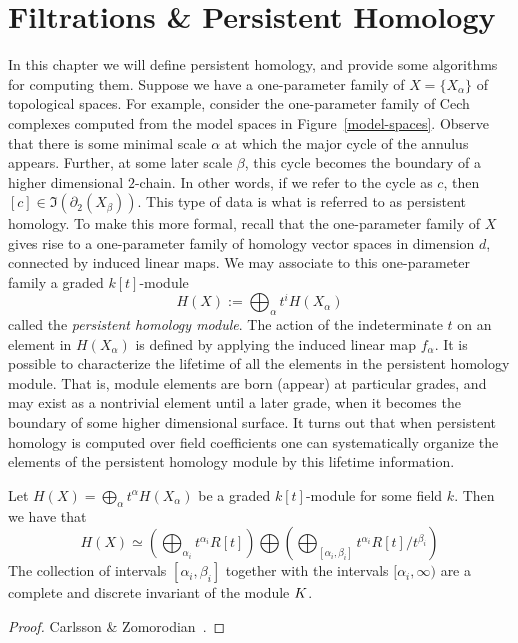 \chapter{Filtrations \& Persistent Homology}
In this chapter we will define persistent homology, and provide some algorithms for computing them. Suppose we have a one-parameter family of  $X = \{ X_\alpha \}$ of topological spaces. For example, consider the one-parameter family of Cech complexes computed from the model spaces in Figure~\ref{model-spaces}. Observe that there is some minimal scale $\alpha$ at which the major cycle of the annulus appears. Further, at some later scale $\beta$, this cycle becomes the boundary of a higher dimensional $2$-chain. In other words, if we refer to the cycle as $c$, then $[c] \in \Im(\partial_2(X_\beta))$. This type of data is what is referred to as persistent homology. To make this more formal, recall that the one-parameter family of $X$ gives rise to a one-parameter family of homology vector spaces in dimension $d$, connected by induced linear maps. We may associate to this one-parameter family a graded $k[t]$-module \[ H(X) := \bigoplus_\alpha t^i H(X_\alpha) \] called the \emph{persistent homology module}. The action of the indeterminate $t$ on an element in $H(X_\alpha)$ is defined by applying the induced linear map $f_\alpha$. It is possible to characterize the lifetime of all the elements in the persistent homology module. That is, module elements are born (appear) at particular grades, and may exist as a nontrivial element until a later grade, when it becomes the boundary of some higher dimensional surface. It turns out that when persistent homology is computed over field coefficients one can systematically organize the elements of the persistent homology module by this lifetime information. 
\begin{theorem} Let $H(X) = \bigoplus_\alpha t^\alpha H(X_\alpha)$ be a graded $k[t]$-module for some field $k$. Then we have that 
\[ H(X) \simeq \left( \bigoplus_{\alpha_i}t^{\alpha_i}R[t] \right) \bigoplus \left( \bigoplus_{[\alpha_i, \beta_i]} t^{\alpha_i}R[t]/t^{\beta_i}  \right)  \]
The collection of intervals $[\alpha_i,\beta_i]$ together with the intervals $[\alpha_i, \infty)$ are a complete and discrete invariant 
of the module $K$. 
\end{theorem}
\begin{proof}
Carlsson \& Zomorodian~\cite{zc-cph-04}.
\end{proof}
